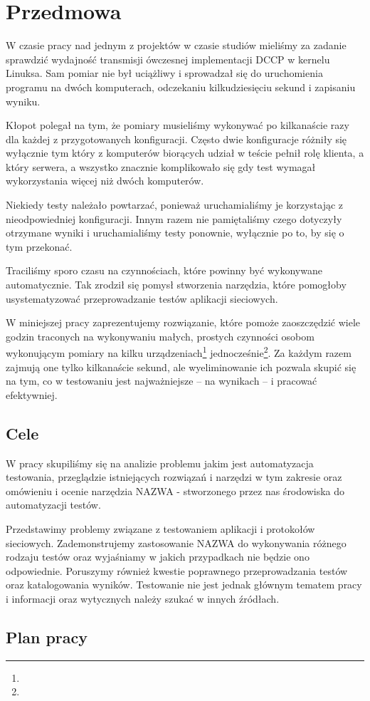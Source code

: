 \documentclass[00-praca-magisterska.tex]{subfiles}
\begin{document}
\chapter{Przedmowa}

W czasie pracy nad jednym z projektów w czasie studiów mieliśmy za zadanie
sprawdzić wydajność transmisji ówczesnej implementacji DCCP w kernelu Linuksa.
Sam pomiar nie był uciążliwy i sprowadzał się do uruchomienia programu na dwóch
komputerach, odczekaniu kilkudziesięciu sekund i zapisaniu wyniku.

Kłopot polegał na tym, że pomiary musieliśmy wykonywać po kilkanaście razy dla
każdej z przygotowanych konfiguracji. Często dwie konfiguracje różniły się
wyłącznie tym który z komputerów biorących udział w teście pełnił rolę klienta,
a który serwera, a wszystko znacznie komplikowało się gdy test wymagał
wykorzystania więcej niż dwóch komputerów.

Niekiedy testy należało powtarzać, ponieważ uruchamialiśmy je korzystając z
nieodpowiedniej konfiguracji. Innym razem nie pamiętaliśmy czego dotyczyły
otrzymane wyniki i uruchamialiśmy testy ponownie, wyłącznie po to, by się o tym
przekonać.

Traciliśmy sporo czasu na czynnościach, które powinny być wykonywane
automatycznie. Tak zrodził się pomysł stworzenia narzędzia, które
pomogłoby usystematyzować przeprowadzanie testów aplikacji sieciowych.

W miniejszej pracy zaprezentujemy rozwiązanie, które pomoże zaoszczędzić wiele
godzin traconych na wykonywaniu małych, prostych czynności osobom wykonującym
pomiary na kilku urządzeniach\footnote{}
jednocześnie\footnote{}. Za każdym razem
zajmują one tylko kilkanaście sekund, ale wyeliminowanie ich pozwala skupić się
na tym, co w testowaniu jest najważniejsze -- na wynikach -- i pracować
efektywniej.

\section{Cele}


W pracy skupiliśmy się na analizie problemu jakim jest automatyzacja
testowania, przeglądzie istniejących rozwiązań i narzędzi w tym zakresie oraz
omówieniu i ocenie narzędzia NAZWA - stworzonego przez nas środowiska do
automatyzacji testów.

Przedstawimy problemy związane z testowaniem aplikacji i protokołów sieciowych.
Zademonstrujemy zastosowanie NAZWA do wykonywania różnego rodzaju testów oraz
wyjaśniamy w jakich przypadkach nie będzie ono odpowiednie.  Poruszymy również
kwestie poprawnego przeprowadzania testów oraz katalogowania wyników.
Testowanie nie jest jednak głównym tematem pracy i informacji oraz wytycznych
należy szukać w innych źródłach.

\section{Plan pracy}

\end{document}

